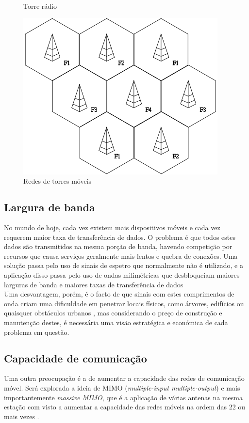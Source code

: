 \documentclass{llncs}
\begin{document}
\begin{figure}[H]
\begin{minipage}{0.45\textwidth}
        \caption{Torre rádio \cite{img1}}
    \end{minipage}\hfill
    \begin{minipage}{0.45\textwidth}
        \centering
        \includegraphics[scale=0.5]{network.png}
        \caption{Redes de torres móveis \cite{img2}}
    \end{minipage}
\end{figure}

\subsection{Largura de banda}
\hspace*{1.5em} No mundo de hoje, cada vez existem mais dispositivos móveis e cada vez requerem maior taxa de transferência de dados. O problema é que todos estes dados são transmitidos na mesma porção de banda, havendo competição por recursos que causa serviços geralmente mais lentos e quebra de conexões. Uma solução passa pelo uso de sinais de espetro que normalmente não é utilizado, e a aplicação disso passa pelo uso de ondas milimétricas que desbloqueiam maiores larguras de banda e maiores taxas de transferência de dados \cite{Mis:El} \\
\hspace*{1.5em} Uma desvantagem, porém, é o facto de que sinais com estes comprimentos de onda criam uma dificuldade em penetrar locais físicos, como árvores, edifícios ou quaisquer obstáculos urbanos \cite{everything:to:know}, mas considerando o preço de construção e manutenção destes, é necessária uma visão estratégica e económica de cada problema em questão.

\subsection{Capacidade de comunicação}
\hspace*{1.5em} Uma outra preocupação é a de aumentar a capacidade das redes de comunicação móvel. Será explorada a ideia de MIMO (\textit{multiple-input multiple-output}) e mais importantemente \textit{massive MIMO}, que é a aplicação de várias antenas na mesma estação com visto a aumentar a capacidade das redes móveis na ordem das 22 ou mais vezes \cite{everything:to:know}.
\end{document}
